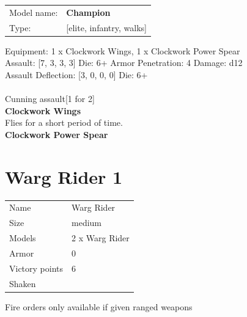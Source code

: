 \begin{tabular}{ll}
Model name: & {\bf Champion } \\
Type: & [elite, infantry, walks] \\
\end{tabular}

Equipment: 1 x Clockwork Wings, 1 x Clockwork Power Spear \\

Assault: [7, 3, 3, 3] Die: 6+ Armor Penetration: 4 Damage: d12 \\
Assault Deflection: [3, 0, 0, 0] Die: 6+\\
\\ 
Cunning assault[1 for 2]\\ 
 



{\bf Clockwork Wings } \\

Flies for a short period of time.\\ 





{\bf Clockwork Power Spear } \\






 















\clearpage

\section{ Warg Rider 1 }

\begin{tabular}{ll}
  Name & Warg Rider \\
  Size & medium\\
  Models & 2 x Warg Rider\\
  Armor & 0\\
  Victory points & 6\\
  Shaken & \\
\end{tabular}

Fire orders only available if given ranged weapons\\ 



